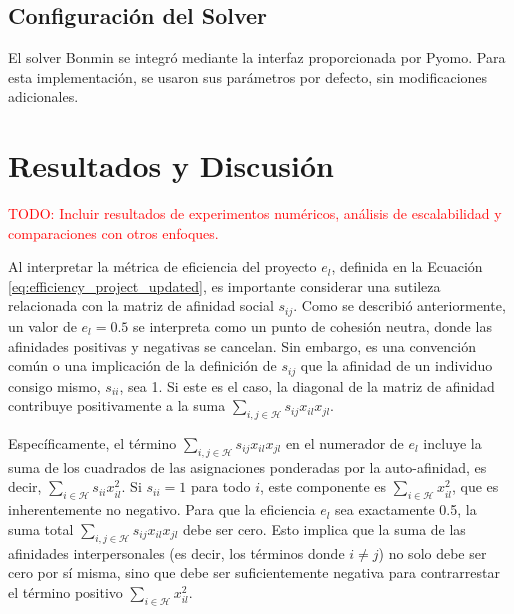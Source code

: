 \documentclass[conference]{IEEEtran}
\begin{document}
\subsection{Configuración del Solver}

El solver Bonmin se integró mediante la interfaz proporcionada por Pyomo. Para esta implementación, se usaron sus parámetros por defecto, sin modificaciones adicionales.


\section{Resultados y Discusión}

\textcolor{red}{TODO: Incluir resultados de experimentos numéricos, análisis de escalabilidad y comparaciones con otros enfoques.}

Al interpretar la métrica de eficiencia del proyecto $e_l$, definida en la Ecuación \ref{eq:efficiency_project_updated}, es importante considerar una sutileza relacionada con la matriz de afinidad social $s_{ij}$. Como se describió anteriormente, un valor de $e_l=0.5$ se interpreta como un punto de cohesión neutra, donde las afinidades positivas y negativas se cancelan. Sin embargo, es una convención común o una implicación de la definición de $s_{ij}$ que la afinidad de un individuo consigo mismo, $s_{ii}$, sea 1. Si este es el caso, la diagonal de la matriz de afinidad contribuye positivamente a la suma $\sum_{i,j \in \mathcal{H}} s_{ij} x_{il} x_{jl}$.

Específicamente, el término $\sum_{i,j \in \mathcal{H}} s_{ij} x_{il} x_{jl}$ en el numerador de $e_l$ incluye la suma de los cuadrados de las asignaciones ponderadas por la auto-afinidad, es decir, $\sum_{i \in \mathcal{H}} s_{ii} x_{il}^2$. Si $s_{ii}=1$ para todo $i$, este componente es $\sum_{i \in \mathcal{H}} x_{il}^2$, que es inherentemente no negativo. Para que la eficiencia $e_l$ sea exactamente 0.5, la suma total $\sum_{i,j \in \mathcal{H}} s_{ij} x_{il} x_{jl}$ debe ser cero. Esto implica que la suma de las afinidades interpersonales (es decir, los términos donde $i \neq j$) no solo debe ser cero por sí misma, sino que debe ser suficientemente negativa para contrarrestar el término positivo $\sum_{i \in \mathcal{H}} x_{il}^2$.
\end{document}
